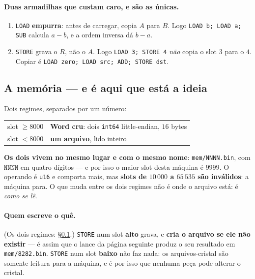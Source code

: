 \documentclass[11pt]{article}
\newcommand{\code}[1]{\texttt{\small #1}}
\theoremstyle{plain}
\theoremstyle{remark}
\begin{document}
\paragraph{Duas armadilhas que custam caro, e são as únicas.}

\begin{enumerate}
\item \code{LOAD} \textbf{empurra}: antes de carregar, copia $A$ para $B$. Logo
\code{LOAD b; LOAD a; SUB} calcula $a-b$, e a ordem inversa dá $b-a$.
\item \code{STORE} grava o \textbf{$R$}, não o $A$. Logo \code{LOAD 3; STORE 4}
\emph{não} copia o slot $3$ para o $4$. Copiar é
\code{LOAD zero; LOAD src; ADD; STORE dst}.
\end{enumerate}

\subsection{A memória --- e é aqui que está a ideia}\label{sec:80mem}

Dois regimes, separados por um número:

\begin{center}
\begin{tabular}{@{}ll@{}}
\toprule
slot $\ge 8000$ & \textbf{Word cru}: dois \code{int64} little-endian, $16$ bytes \\
slot $< 8000$ & \textbf{um arquivo}, lido inteiro \\
\bottomrule
\end{tabular}
\end{center}

\noindent \textbf{Os dois vivem no mesmo lugar e com o mesmo nome}:
\code{mem/NNNN.bin}, com $\mathtt{NNNN}$ em quatro dígitos --- e por isso o
maior slot desta máquina é $9999$. O operando é \code{u16} e comporta mais, mas
\textbf{slots de $10\,000$ a $65\,535$ são inválidos}: a máquina para. O que muda entre os dois regimes não é onde
o arquivo está: é \emph{como se lê}.

\paragraph{Quem escreve o quê.} (Os dois regimes: \S\ref{sec:80mem}.) \code{STORE} num slot \textbf{alto} grava, e
\textbf{cria o arquivo se ele não existir} --- é assim que o lance da página
seguinte produz o seu resultado em \code{mem/8282.bin}. \code{STORE} num slot
\textbf{baixo} não faz nada: os arquivos-cristal são somente leitura para a
máquina, e é por isso que nenhuma peça pode alterar o cristal.
\end{document}
